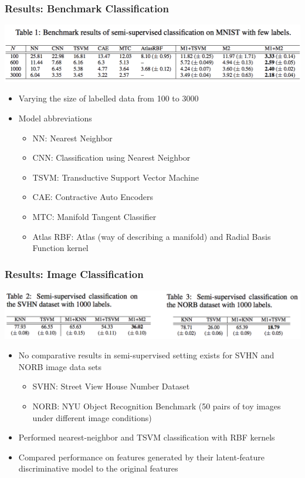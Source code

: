 \documentclass{beamer}
\begin{document}
\begin{frame}
  \frametitle{Results: Benchmark Classification}

  \includegraphics[scale=0.5]{table1}

  \begin{itemize}
  \item Varying the size of labelled data from 100 to 3000
  \item Model abbreviations
    \begin{itemize}
    \item NN: Nearest Neighbor
    \item CNN: Classification using Nearest Neighbor 
    \item TSVM: Transductive Support Vector Machine
    \item CAE: Contractive Auto Encoders
    \item MTC: Manifold Tangent Classifier
    \item Atlas RBF: Atlas (way of describing a manifold) and Radial Basis
      Function kernel
    \end{itemize}
  \end{itemize}
  
\end{frame}
\begin{frame}
  \frametitle{Results: Image Classification}

  \includegraphics[scale=0.5]{table2and3}

  \begin{itemize}
  \item No comparative results in semi-supervised setting exists for
    SVHN and NORB image data sets
    \begin{itemize}
    \item SVHN: Street View House Number Dataset
    \item NORB: NYU Object Recognition Benchmark (50 pairs of toy images under
      different image conditions)
      \end{itemize}
  \item Performed nearest-neighbor and TSVM classification with RBF
    kernels
  \item Compared performance on features generated by their latent-feature
    discriminative model to the original features
    \end{itemize}

\end{frame}
\end{document}
